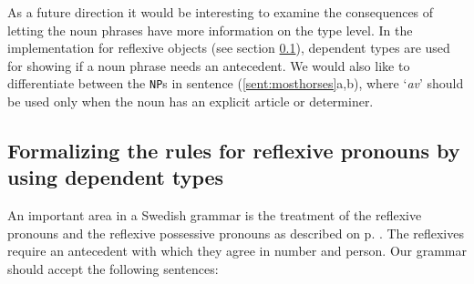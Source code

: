\documentclass{report}
\begin{document}
As a future direction it would be interesting to examine the consequences of
letting the noun phrases have more information on the type level. In the
implementation for reflexive objects  (see section \ref{sec:reflexives}),
dependent types are used for showing if a noun phrase 
needs an antecedent.
We would also like to differentiate between the \verb-NP-s in sentence
(\ref{sent:mosthorses}a,b), where 
`\emph{av}' should be used
only when the noun has an explicit article or determiner.
\label{sent:mosthorses}



% 
\subsection{Formalizing the rules for reflexive pronouns by using dependent types}
\label{sec:reflexives}
An important area in a Swedish grammar is the treatment of the reflexive pronouns and
the reflexive possessive pronouns as described on p. \pageref{swe:refl}.
The reflexives require an antecedent with which they agree in
number and person.
Our grammar should accept the following sentences:
\end{document}
